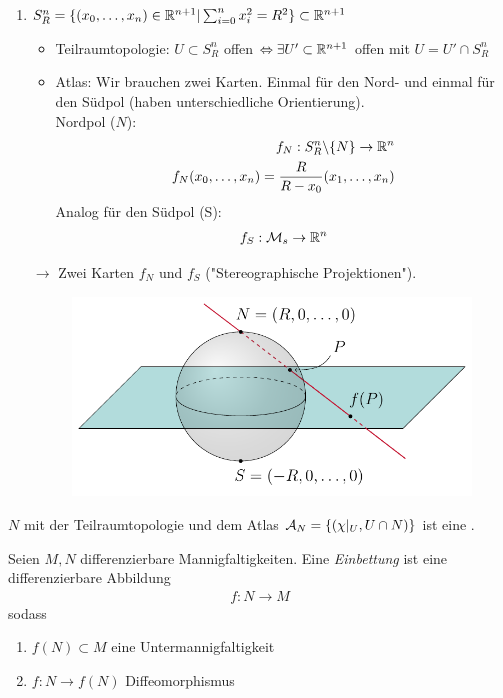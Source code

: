 \begin{bsp}
\begin{enumerate}
\item $S_R^n = \{ (x_0, \dots, x_n) \in \mathbb{R}^{n+1} \vert \sum_{i=0}^n x_i^2 = R^2 \} \subset \mathbb{R}^{n+1}$

\begin{itemize}
\item Teilraumtopologie: $U \subset S^n_R$ offen $\Leftrightarrow \exists U' \subset \mathbb{R}^{n+1}$ offen mit $U = U' \cap S^n_R$
\item Atlas: Wir brauchen zwei Karten. 
Einmal für den Nord- und einmal für den Südpol (haben unterschiedliche Orientierung).  \\
Nordpol ($N$):
\begin{align}
f_N : S^n_R \backslash \{ N \} \to \mathbb{R}^n \\
f_N (x_0, \dots , x_n) = \frac{R}{R- x_0} (x_1, \dots, x_n) 
\end{align}
Analog für den Südpol (S):
\begin{align}
f_S : \mathcal{M}_s \to \mathbb{R}^n
\end{align}
\end{itemize}
$\to$ Zwei Karten $f_N$ und $f_S$ ("Stereographische Projektionen").
\begin{figure}[H]
\centering
\includegraphics[scale=0.8]{figures/tikz/stereographic_projection.pdf}
\end{figure}
\end{enumerate}
\end{bsp}

\begin{bem}
$N$ mit der Teilraumtopologie und dem Atlas $\mathcal{A}_N = \left\{(\chi\vert_U, U\cap N)\right\}$ ist eine \difM.
\end{bem}

\begin{defs}
Seien $M, N$ differenzierbare Mannigfaltigkeiten. Eine \textit{Einbettung} ist eine differenzierbare Abbildung
\begin{align*}
f: N \rightarrow M
\end{align*}
sodass
\begin{enumerate}
\item$f(N)\subset M$ eine Untermannigfaltigkeit 
\item$f: N \rightarrow f(N)$ Diffeomorphismus
\end{enumerate}
\end{defs}

